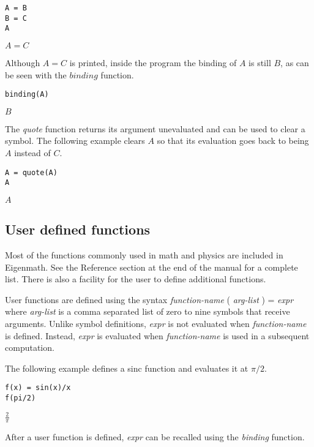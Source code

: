 \begin{Verbatim}[formatcom=\color{blue}]
A = B
B = C
A
\end{Verbatim}

\noindent
$\displaystyle A=C$

\bigskip
\noindent
Although $A=C$ is printed,
inside the program the binding of $A$ is still $B$, as can be seen with
the $binding$ function.

\begin{Verbatim}[formatcom=\color{blue}]
binding(A)
\end{Verbatim}

\noindent
$\displaystyle B$

\bigskip
\noindent
The {\it quote} function returns its argument unevaluated
and can be used to clear a symbol.
The following example clears $A$ so that its evaluation goes back to
being $A$ instead of $C$.

\begin{Verbatim}[formatcom=\color{blue}]
A = quote(A)
A
\end{Verbatim}

\noindent
$\displaystyle A$

\subsection{User defined functions}

Most of the functions commonly used in math and physics are included in Eigenmath.
See the Reference section at the end of the manual for a complete list.
There is also a facility for the user to define additional functions.

\bigskip
\noindent
User functions are defined using the syntax {\it function-name} ( {\it arg-list} ) = {\it expr}
where {\it arg-list} is a comma separated list of zero to nine symbols that receive arguments.
Unlike symbol definitions, {\it expr} is not evaluated when {\it function-name} is defined.
Instead, {\it expr} is evaluated when {\it function-name} is used in a subsequent computation.

\bigskip
\noindent
The following example defines a sinc function and evaluates it at $\pi/2$.

\begin{Verbatim}[formatcom=\color{blue}]
f(x) = sin(x)/x
f(pi/2)
\end{Verbatim}

\noindent
$\displaystyle \frac{2}{\pi}$

\bigskip
\noindent
After a user function is defined, {\it expr} can be recalled using the {\it binding} function.

